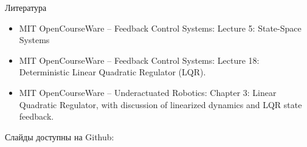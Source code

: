 \documentclass{beamer}
\newcommand{\myqrframe}{
	\begin{frame}
		\centerline{Слайды доступны на Github:}
		\bigskip
		\centerline{\mygit}
		\bigskip
		\myqr
	\end{frame}
}
\begin{document}
	\begin{frame}{Литература}
		
		\begin{itemize}
			
			
	\item MIT OpenCourseWare -- Feedback Control Systems: 
{Lecture 5: State-Space Systems}

		\item MIT OpenCourseWare -- Feedback Control Systems: 
{Lecture 18: Deterministic Linear Quadratic Regulator (LQR).}

		\item MIT OpenCourseWare -- Underactuated Robotics: 
{Chapter 3: Linear Quadratic Regulator, with discussion of linearized dynamics and LQR state feedback.}
			
		\end{itemize}
		
	\end{frame}



\myqrframe
\end{document}
